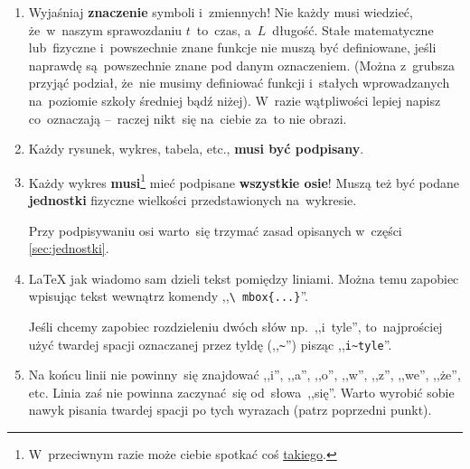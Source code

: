 \documentclass[a4paper,11pt]{article}
\newcommand{\tbs}{\textbackslash}  %
\newcommand{\tb}{\textbf}
\begin{document}
\begin{enumerate}
\item Wyjaśniaj \textbf{znaczenie} symboli i~zmiennych! Nie każdy musi
  wiedzieć, że~w~naszym sprawozdaniu $t$~to~czas, a~$L$~długość. Stałe
  matematyczne lub~fizyczne i~powszechnie znane funkcje nie muszą być
  definiowane, jeśli naprawdę są~powszechnie znane pod danym
  oznaczeniem. (Można z~grubsza przyjąć podział, że~nie musimy
  definiować funkcji i~stałych wprowadzanych na~poziomie szkoły
  średniej bądź niżej). W~razie wątpliwości lepiej napisz co~oznaczają
  --~raczej nikt~się na~ciebie za~to nie obrazi.
\item Każdy rysunek, wykres, tabela, etc., \textbf{musi być podpisany}.
\item Każdy wykres \tb{musi}\footnote{W~przeciwnym razie może ciebie
    spotkać coś \href{https://xkcd.com/833/}{takiego}.} mieć podpisane
  \textbf{wszystkie osie}! Muszą też być podane \tb{jednostki} fizyczne
  wielkości przedstawionych na~wykresie.

  Przy podpisywaniu osi warto~się trzymać zasad opisanych w~części
  \eqref{sec:jednostki}.
\item \LaTeX{} jak wiadomo sam dzieli tekst pomiędzy liniami. Można
  temu zapobiec wpisując tekst wewnątrz komendy ,,\texttt{\tbs
    mbox\{...\}}''.

  Jeśli chcemy zapobiec rozdzieleniu dwóch słów np.~,,i~tyle'',
  to~najprościej użyć twardej spacji oznaczanej przez tyldę
  (,,\verb+~+'') pisząc ,,\verb+i~tyle+''.
\item Na końcu linii nie powinny~się znajdować ,,i'', ,,a'', ,,o'',
  ,,w'', ,,z'', ,,we'', ,,że'', etc. Linia zaś nie powinna
  zaczynać~się od~słowa~,,się''. Warto wyrobić sobie nawyk pisania
  twardej spacji po tych wyrazach (patrz poprzedni punkt).


\end{enumerate}
\end{document}
